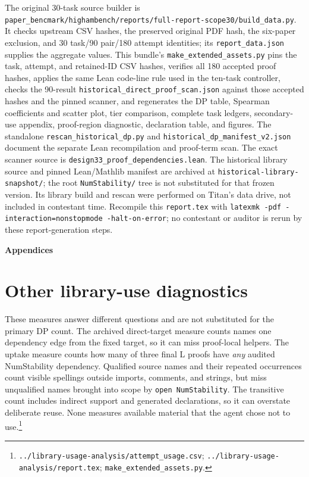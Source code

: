 \documentclass[10pt]{article}
\newcommand{\pathref}[1]{\nolinkurl{#1}}
\begin{document}
The original 30-task source builder is
\pathref{paper_bencmark/highambench/reports/full-report-scope30/build_data.py}.
It checks upstream CSV hashes, the preserved original PDF hash, the
six-paper exclusion, and 30 task/90 pair/180 attempt identities;
its \pathref{report_data.json} supplies the aggregate values.
This bundle's \pathref{make_extended_assets.py} pins the task, attempt,
and retained-ID CSV hashes, verifies all 180 accepted proof hashes,
applies the same Lean code-line rule used in the ten-task controller,
checks the 90-result \pathref{historical_direct_proof_scan.json} against
those accepted hashes and the pinned scanner, and regenerates the DP
table, Spearman coefficients and
scatter plot, tier comparison, complete task ledgers, secondary-use
appendix, proof-region diagnostic, declaration table, and figures.
The standalone \pathref{rescan_historical_dp.py} and
\pathref{historical_dp_manifest_v2.json} document the separate Lean
recompilation and proof-term scan. The exact scanner source is
\pathref{design33_proof_dependencies.lean}. The historical library
source and pinned Lean/Mathlib manifest are archived at
\pathref{historical-library-snapshot/}; the root
\pathref{NumStability/} tree is not substituted for that frozen version.
Its library build and
rescan were performed on Titan's data drive, not included in contestant
time. Recompile this
\pathref{report.tex} with \texttt{latexmk -pdf
-interaction=nonstopmode -halt-on-error}; no contestant or auditor is
rerun by these report-generation steps.

\clearpage
\appendix
\begin{center}
{\Large\bfseries Appendices}
\end{center}
\medskip
\section{Other library-use diagnostics}\label{app:otherusage}
These measures answer different questions and are not substituted for
the primary DP count. The archived direct-target measure counts names
one dependency edge from the fixed target, so it can miss proof-local
helpers. The uptake measure counts how many of
three final L proofs have \emph{any} audited NumStability dependency.
Qualified source names and their repeated occurrences count visible
spellings outside imports, comments, and strings, but miss unqualified
names brought into scope by \texttt{open NumStability}. The transitive
count includes indirect support and generated declarations, so it can
overstate deliberate reuse. None measures available material that the
agent chose not to use.\footnote{\pathref{../library-usage-analysis/attempt_usage.csv};
\pathref{../library-usage-analysis/report.tex};
\pathref{make_extended_assets.py}.}
\end{document}
